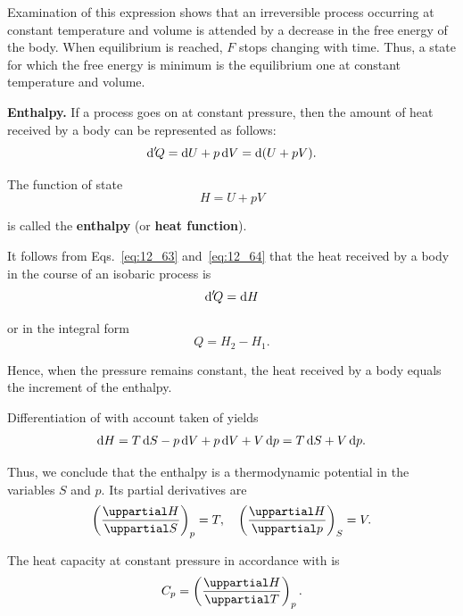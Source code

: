 \noindent
Examination of this expression shows that an irreversible process occurring at constant temperature and volume is attended by a decrease in the free energy of the body. When equilibrium is reached, $F$ stops changing with time. Thus, a state for which the free energy is minimum is the equilibrium one at constant temperature and volume.

\textbf{Enthalpy.} If a process goes on at constant pressure, then the amount of heat received by a body can be represented as follows:
\begin{equation}\label{eq:12_63}
	\mathrm{d}'\!Q = \mathrm{d} U + p\,\mathrm{d} V = \mathrm{d}(U + pV).
\end{equation}

\noindent
The function of state
\begin{equation}\label{eq:12_64}
	H = U + pV
\end{equation}

\noindent
is called the \textbf{enthalpy} (or \textbf{heat function}).

It follows from Eqs.~\eqref{eq:12_63} and~\eqref{eq:12_64} that the heat received by a body in the course of an isobaric process is
\begin{equation}\label{eq:12_65}
	\mathrm{d}'\!Q = \mathrm{d} H
\end{equation}

\noindent
or in the integral form
\begin{equation}\label{eq:12_66}
	Q = H_2 - H_1.
\end{equation}

\noindent
Hence, when the pressure remains constant, the heat received by a body equals the increment of the enthalpy.

Differentiation of  with account taken of  yields
\begin{equation}\label{eq:12_67}
	\mathrm{d} H = T\,\mathrm{d} S - p\,\mathrm{d} V + p\,\mathrm{d} V + V\,\mathrm{d} p = T\,\mathrm{d} S + V\,\mathrm{d} p.
\end{equation}

\noindent
Thus, we conclude that the enthalpy is a thermodynamic potential in the variables $S$ and $p$. Its partial derivatives are
\begin{equation}\label{eq:12_68}
	\parenthesis{\diffpartial{H}{S}}_p = T,\quad 	\parenthesis{\diffpartial{H}{p}}_S = V.
\end{equation}

The heat capacity at constant pressure in accordance with  is
\begin{equation}\label{eq:12_69}
	C_p = \parenthesis{\diffpartial{H}{T}}_p.
\end{equation}


